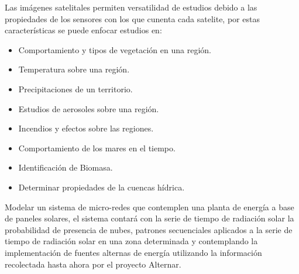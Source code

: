 Las imágenes satelitales permiten versatilidad de estudios debido a las propiedades de los sensores con los que cunenta cada satelite, por estas características se puede
enfocar estudios en:

\begin{itemize}
 \item Comportamiento y tipos de vegetación en una región.
 \item Temperatura sobre una región.
 \item Precipitaciones de un territorio.
 \item Estudios de aerosoles sobre una región.
 \item Incendios y efectos sobre las regiones.
 \item Comportamiento de los mares en el tiempo.
 \item Identificación de Biomasa.
 \item Determinar propiedades de la cuencas hídrica.
\end{itemize}

Modelar un sistema de micro-redes que contemplen una planta de energía a base de paneles solares, el sistema contará con la serie de tiempo de radiación solar la
probabilidad de presencia de nubes, patrones secuenciales aplicados a la serie de tiempo de radiación solar en una zona determinada y contemplando la implementación
de fuentes alternas de energía utilizando la información recolectada hasta ahora por el proyecto Alternar.



